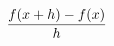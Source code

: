 \documentclass[preview]{standalone}
\begin{document}
\begin{align*}
{f(x+h) - f(x) \over h}
\end{align*}
\end{document}
